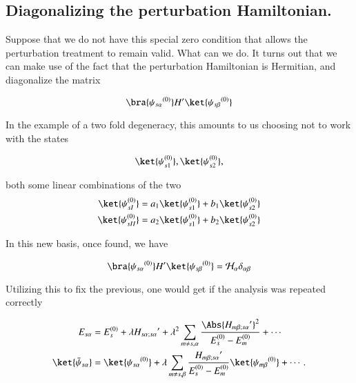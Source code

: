 

\subsection{Diagonalizing the perturbation Hamiltonian.}

Suppose that we do not have this special zero condition that allows the perturbation treatment to remain valid.  What can we do.  It turns out that we can make use of the fact that the perturbation Hamiltonian is Hermitian, and diagonalize the matrix

\begin{equation}\label{eqn:qmTwoL5:110}
\bra{{\psi_{s \alpha}}^{(0)}} H' \ket{{\psi_{s \beta}}^{(0)}} 
\end{equation}

In the example of a two fold degeneracy, this amounts to us choosing not to work with the states

\begin{equation}\label{eqn:qmTwoL5:130}
\ket{\psi_{s1}^{(0)}}, \ket{\psi_{s2}^{(0)}},
\end{equation}

both some linear combinations of the two
\begin{align}\label{eqn:qmTwoL5:150}
\ket{\psi_{sI}^{(0)}} &= a_1 \ket{\psi_{s1}^{(0)}} + b_1 \ket{\psi_{s2}^{(0)}} \\
\ket{\psi_{sII}^{(0)}} &= a_2 \ket{\psi_{s1}^{(0)}} + b_2 \ket{\psi_{s2}^{(0)}} 
\end{align}

In this new basis, once found, we have

\begin{equation}\label{eqn:qmTwoL5:170}
\bra{{\psi_{s \alpha}}^{(0)}} H' \ket{{\psi_{s \beta}}^{(0)}} = \mathcal{H}_\alpha \delta_{\alpha \beta}
\end{equation}

Utilizing this to fix the previous, one would get if the analysis was repeated correctly

\begin{align}\label{eqn:qmTwoL5:190}
E_{s\alpha} &= E_s^{(0)} + \lambda {H_{s\alpha ; s\alpha}}' 
+ \lambda^2 
\sum_{m \ne s, \alpha} 
\frac{\Abs{{H_{m \beta ; s \alpha}}'}^2 }
{ E_s^{(0)} - E_m^{(0)} } 
+ \cdots
\\
\ket{\bar{\psi}_{s \alpha}} &= \ket{{\psi_{s \alpha}}^{(0)}} 
+ \lambda
\sum_{m \ne s, \beta} 
\frac{{H_{m \beta ; s \alpha}}'}
{ E_s^{(0)} - E_m^{(0)} } \ket{{\psi_{m \beta}}^{(0)}}
+ \cdots.
\end{align}

